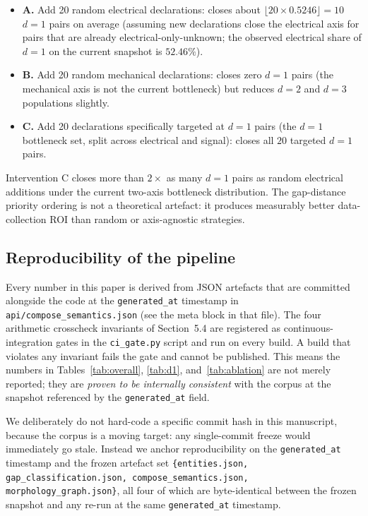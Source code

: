 \documentclass[review]{elsarticle}
\begin{document}
\begin{itemize}[nosep,leftmargin=*]
\item \textbf{A.} Add 20 random electrical declarations: closes
about $\lfloor 20 \times 0.5246 \rfloor = 10$ $d=1$ pairs on average
(assuming new declarations close the electrical axis for pairs that
are already electrical-only-unknown; the observed electrical share
of $d=1$ on the current snapshot is $52.46\%$).

\item \textbf{B.} Add 20 random mechanical declarations: closes
zero $d=1$ pairs (the mechanical axis is not the current bottleneck)
but reduces $d=2$ and $d=3$ populations slightly.

\item \textbf{C.} Add 20 declarations specifically targeted at
$d=1$ pairs (the $d=1$ bottleneck set, split across electrical and
signal): closes all $20$ targeted $d=1$ pairs.
\end{itemize}

Intervention C closes more than $2\times$ as many $d=1$ pairs as
random electrical additions under the current two-axis bottleneck
distribution. The gap-distance priority ordering is not a
theoretical artefact: it produces measurably better data-collection
ROI than random or axis-agnostic strategies.

\subsection{Reproducibility of the pipeline}

Every number in this paper is derived from JSON artefacts that are
committed alongside the code at the \texttt{generated\_at} timestamp
in \texttt{api/compose\_semantics.json} (see the meta block in that
file). The four arithmetic crosscheck invariants of Section~5.4 are
registered as continuous-integration gates in the
\texttt{ci\_gate.py} script and run on every build. A build that
violates any invariant fails the gate and cannot be published.
This means the numbers in Tables~\ref{tab:overall},
\ref{tab:d1}, and~\ref{tab:ablation} are not merely reported;
they are \emph{proven to be internally consistent} with the corpus
at the snapshot referenced by the \texttt{generated\_at} field.

We deliberately do not hard-code a specific commit hash in this
manuscript, because the corpus is a moving target: any single-commit
freeze would immediately go stale. Instead we anchor reproducibility
on the \texttt{generated\_at} timestamp and the frozen artefact
set \texttt{\{entities.json, gap\_classification.json,
compose\_semantics.json, morphology\_graph.json\}}, all four of
which are byte-identical between the frozen snapshot and any
re-run at the same \texttt{generated\_at} timestamp.
\end{document}
